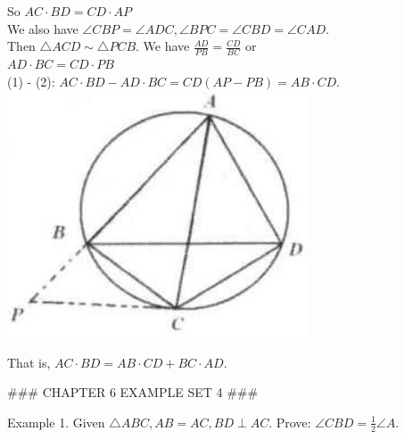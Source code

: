 \documentclass[10pt]{article}
\begin{document}
So \(A C \cdot B D=C D \cdot A P\)\\
We also have \(\angle C B P=\angle A D C, \angle B P C=\angle C B D=\angle C A D\).\\
Then \(\triangle A C D \sim \triangle P C B\). We have \(\frac{A D}{P B}=\frac{C D}{B C}\) or\\
\(A D \cdot B C=C D \cdot P B\)\\
(1) - (2): \(A C \cdot B D-A D \cdot B C=C D(A P-P B)=A B \cdot C D\).\\
\includegraphics[max width=\textwidth, center]{2025_04_17_97bc1f7e44d93c271a88g-193(1)}

That is, \(A C \cdot B D=A B \cdot C D+B C \cdot A D\).


### CHAPTER 6 EXAMPLE SET 4 ###

Example 1. Given \(\triangle A B C, A B=A C, B D \perp A C\). Prove: \(\angle C B D=\frac{1}{2} \angle A\).
\end{document}
